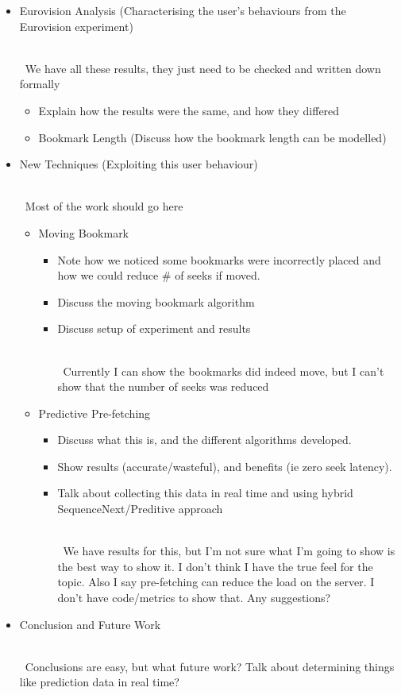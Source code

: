 \documentclass[a4paper]{article}
\newcommand{\note}[1]{
    {~\\~\color{red}\sf #1 }
}
\begin{document}
\begin{itemize}
\cbstart[7pt]
    \item Eurovision Analysis (Characterising the user's behaviours from the Eurovision experiment)
    \note{We have all these results, they just need to be checked and written down formally}
    
    \begin{itemize}
        \item Explain how the results were the same, and how they differed
        \item Bookmark Length (Discuss how the bookmark length can be modelled)
    \end{itemize}
\cbend

\cbstart[7pt]
    \item New Techniques (Exploiting this user behaviour)
        \note{Most of the work should go here}

        \begin{itemize}

            \item Moving Bookmark
                \begin{itemize}
                    \item Note how we noticed some bookmarks were incorrectly placed and how we could reduce \# of seeks if moved.
                    \item Discuss the moving bookmark algorithm
                    \item Discuss setup of experiment and results
                    \note{Currently I can show the bookmarks did indeed move, but I can't show that the number of seeks was reduced}
                \end{itemize}

            \item Predictive Pre-fetching
                \begin{itemize}
                    \item Discuss what this is, and the different algorithms developed.
                    \item Show results (accurate/wasteful), and benefits (ie zero seek latency).
                    \item Talk about collecting this data in real time and using hybrid SequenceNext/Preditive approach

                    \note{We have results for this, but I'm not sure what I'm going to show is the best way to show it. I don't think I have the true feel for the topic. Also I say pre-fetching can reduce the load on the server. I don't have code/metrics to show that. Any suggestions?}
                \end{itemize}

        \end{itemize}
\cbend

    \item Conclusion and Future Work
        \note{Conclusions are easy, but what future work? Talk about determining things like prediction data in real time?}

\end{itemize}
\end{document}

